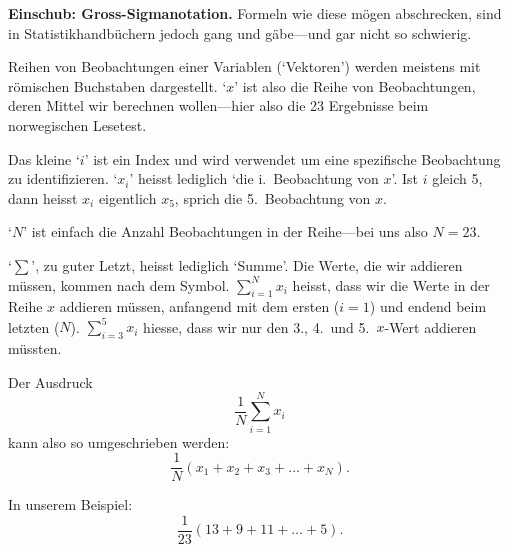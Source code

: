 \documentclass[oneside, 10pt]{book}\usepackage[]{graphicx}\usepackage[]{xcolor}
\begin{document}
\begin{framed}\label{grosssigma}
\textbf{Einschub: Gross-Sigmanotation.} Formeln wie diese mögen abschrecken,
sind in Statistikhandbüchern jedoch gang und gäbe---und gar nicht so schwierig.

Reihen von Beobachtungen einer Variablen (`Vektoren') werden meistens mit
römischen Buchstaben dargestellt. `$x$' ist also die Reihe von Beobachtungen,
deren Mittel wir berechnen wollen---hier also die 23 Ergebnisse beim norwegischen
Lesetest.

Das kleine `$i$' ist ein Index und wird verwendet um eine spezifische Beobachtung
zu identifizieren. `$x_i$' heisst lediglich `die i.\ Beobachtung von $x$'. Ist $i$ gleich 5,
dann heisst $x_i$ eigentlich $x_5$, sprich die 5.\ Beobachtung von $x$.

`$N$' ist einfach die Anzahl Beobachtungen in der Reihe---bei uns also $N = 23$.

`$\sum$', zu guter Letzt, heisst lediglich `Summe'. Die Werte, die wir
addieren müssen, kommen nach dem Symbol. $\sum_{i = 1}^{N} x_i$ heisst,
dass wir die Werte in der Reihe $x$ addieren müssen, anfangend mit dem ersten ($i = 1$)
und endend beim letzten ($N$).
$\sum_{i = 3}^{5} x_i$ hiesse, dass
wir nur den 3., 4.\ und 5.\ $x$-Wert addieren müssten.

Der Ausdruck
\[
  \frac{1}{N} \sum_{i = 1}^{N} x_i
\]
kann also so umgeschrieben werden:
\[
  \frac{1}{N}(x_1 + x_2 + x_3 + \dots + x_N).
\]

In unserem Beispiel:
\[
  \frac{1}{23}(13 + 9 + 11 + \dots + 5).
\]
\end{framed}

\medskip
\end{document}
